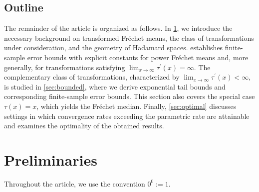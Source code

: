 \documentclass{article}
\newcommand{\pr}{^\prime}
\newcommand{\tran}{\tau}
\newcommand{\dtran}{\tau\pr}
\begin{document}
\subsection{Outline}
% 
The remainder of the article is organized as follows. In \cref{sec:preliminaries}, we introduce the necessary background on transformed Fr\'echet means, the class of transformations under consideration, and the geometry of Hadamard spaces.  establishes finite-sample error bounds with explicit constants for power Fr\'echet means and, more generally, for transformations satisfying $\lim_{x\to\infty}\dtran(x)=\infty$. The complementary class of transformations, characterized by $\lim_{x\to\infty}\dtran(x)<\infty$, is studied in \cref{sec:bounded}, where we derive exponential tail bounds and corresponding finite-sample error bounds. This section also covers the special case $\tran(x)=x$, which yields the Fr\'echet median. Finally, \cref{sec:optimal} discusses settings in which convergence rates exceeding the parametric rate are attainable and examines the optimality of the obtained results.


\section{Preliminaries}\label{sec:preliminaries}
%
Throughout the article, we use the convention $0^0:=1$.
%
\end{document}
